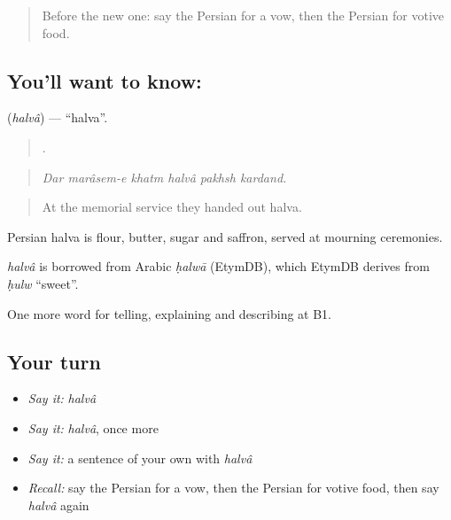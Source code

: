 \label{lesson:FA-C344-halva}



\begin{quote}
Before the new one: say the Persian for a vow, then the Persian for votive food.
\end{quote}

\subsection*{You'll want to know: }
\textbf{} (\emph{halvâ}) — \textquotedblleft{}halva\textquotedblright{}.

\begin{quote}
     .
\end{quote}

\begin{quote}
\emph{Dar marâsem-e khatm halvâ pakhsh kardand.}
\end{quote}

\begin{quote}
At the memorial service they handed out halva.
\end{quote}

Persian halva is flour, butter, sugar and saffron, served at mourning ceremonies.

\begin{cousinweb}
\emph{halvâ} is borrowed from Arabic \emph{ḥalwā} (EtymDB), which EtymDB derives from \emph{ḥulw} \textquotedblleft{}sweet\textquotedblright{}.
\end{cousinweb}

\begin{grammarlens}[title={What you've built}]
One more word for telling, explaining and describing at B1.
\end{grammarlens}

\subsection*{Your turn}
\begin{itemize}
\raggedright
  \item \emph{Say it:} \emph{halvâ}
  \item \emph{Say it:} \emph{halvâ}, once more
  \item \emph{Say it:} a sentence of your own with \emph{halvâ}
  \item \emph{Recall:} say the Persian for a vow, then the Persian for votive food, then say \emph{halvâ} again
\end{itemize}

